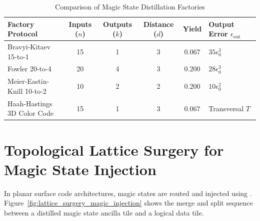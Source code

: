 \begin{table}[htbp]
\centering
\small
\caption{Comparison of Magic State Distillation Factories}
\label{tab:factory_comparison_exp}
\begin{tabularx}{\textwidth}{p{4.5cm} c c c c X}
\toprule
\textbf{Factory Protocol} & \textbf{Inputs ($n$)} & \textbf{Outputs ($k$)} & \textbf{Distance ($d$)} & \textbf{Yield} & \textbf{Output Error $\epsilon_{\text{out}}$} \\
\midrule
Bravyi-Kitaev 15-to-1 & 15 & 1 & 3 & $0.067$ & $35 \epsilon_0^3$ \\
Fowler 20-to-4 & 20 & 4 & 3 & $\mathbf{0.200}$ & $28 \epsilon_0^3$ \\
Meier-Eastin-Knill 10-to-2 & 10 & 2 & 2 & $0.200$ & $10 \epsilon_0^2$ \\
Haah-Hastings 3D Color Code & 15 & 1 & 3 & $0.067$ & Transversal $T$ \\
\bottomrule
\end{tabularx}
\end{table}


\section{Topological Lattice Surgery for Magic State Injection}
\label{sec:lattice_surgery_injection}

In planar surface code architectures, magic states are routed and injected using . Figure~\ref{fig:lattice_surgery_magic_injection} shows the merge and split sequence between a distilled magic state ancilla tile and a logical data tile.

